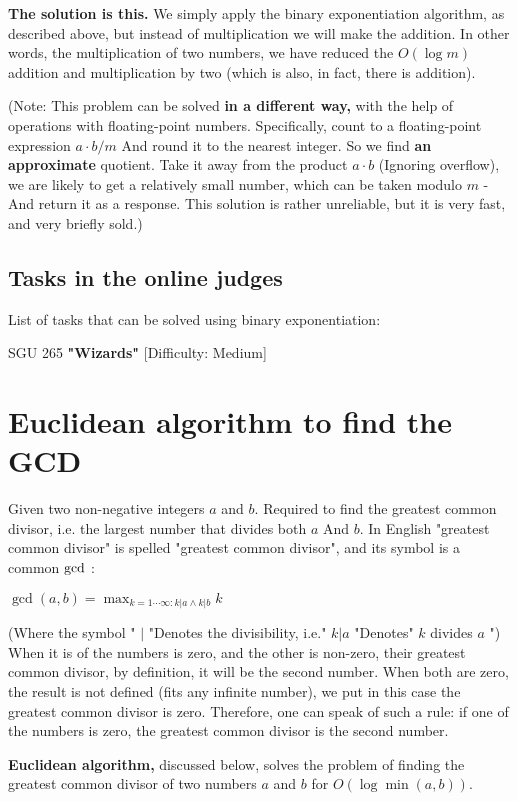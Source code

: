 \textbf{The solution is this.} We simply apply the binary exponentiation algorithm, as described above, but instead of multiplication we will make the addition. In other words, the multiplication of two numbers, we have reduced the $O (\log m)$ addition and multiplication by two (which is also, in fact, there is addition).

(Note: This problem can be solved \textbf{in a different way,} with the help of operations with floating-point numbers. Specifically, count to a floating-point expression $a \cdot b / m$ And round it to the nearest integer. So we find \textbf{an approximate} quotient. Take it away from the product $a \cdot b$ (Ignoring overflow), we are likely to get a relatively small number, which can be taken modulo $m$ - And return it as a response. This solution is rather unreliable, but it is very fast, and very briefly sold.)

\subsection{ Tasks in the online judges }

List of tasks that can be solved using binary exponentiation:

SGU 265 \textbf{"Wizards"} [Difficulty: Medium]
\section{ Euclidean algorithm to find the GCD }
Given two non-negative integers $a$ and $b$. Required to find the greatest common divisor, i.e. the largest number that divides both $a$ And $b$. In English "greatest common divisor" is spelled "greatest common divisor", and its symbol is a common ${\rm gcd}$ :

$\gcd(a,b)=\max_{k=1\cdots\infty:k|a\wedge k|b}k$

(Where the symbol " $|$ "Denotes the divisibility, i.e." $k | a$ "Denotes" $k$ divides $a$ ")
When it is of the numbers is zero, and the other is non-zero, their greatest common divisor, by definition, it will be the second number. When both are zero, the result is not defined (fits any infinite number), we put in this case the greatest common divisor is zero. Therefore, one can speak of such a rule: if one of the numbers is zero, the greatest common divisor is the second number.

\textbf{Euclidean algorithm,} discussed below, solves the problem of finding the greatest common divisor of two numbers $a$ and $b$ for $O (\log \min (a, b))$.

